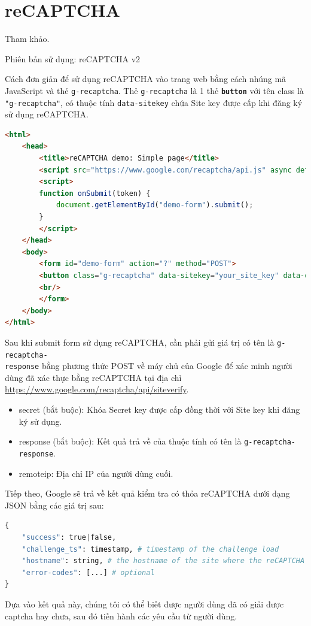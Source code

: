 \section{reCAPTCHA}
Tham khảo\cite{captcha}.
\par
Phiên bản sử dụng: reCAPTCHA v2
\par
Cách đơn giản để sử dụng reCAPTCHA vào trang web bằng cách nhúng mã JavaScript và thẻ \texttt{g-recaptcha}. Thẻ \texttt{g-recaptcha} là 1 thẻ \textbf{\texttt{button}} với tên class là \texttt{"g-recaptcha"}, có thuộc tính \texttt{data-sitekey} chứa Site key được cấp khi đăng ký sử dụng reCAPTCHA.
\begin{lstlisting}[language=HTML]
<html>
  	<head>
    	<title>reCAPTCHA demo: Simple page</title>
     	<script src="https://www.google.com/recaptcha/api.js" async defer></script>
     	<script>
       	function onSubmit(token) {
         	document.getElementById("demo-form").submit();
       	}
     	</script>
  	</head>
  	<body>
    	<form id="demo-form" action="?" method="POST">
      	<button class="g-recaptcha" data-sitekey="your_site_key" data-callback="onSubmit">Submit</button>
      	<br/>
    	</form>
  	</body>
</html>
\end{lstlisting}
\par
Sau khi submit form sử dụng reCAPTCHA, cần phải gửi giá trị có tên là \texttt{g-recaptcha-\\response} bằng phương thức POST về máy chủ của Google để xác minh người dùng đã xác thực bằng reCAPTCHA tại địa chỉ \url{https://www.google.com/recaptcha/api/siteverify}.
\begin{itemize}
	\item secret (bắt buộc): Khóa Secret key được cấp đồng thời với Site key khi đăng ký sử dụng.
	\item response (bắt buộc): Kết quả trả về của thuộc tính có tên là \texttt{g-recaptcha-response}.
	\item remoteip: Địa chỉ IP của người dùng cuối.
\end{itemize}
\par
Tiếp theo, Google sẽ trả về kết quả kiểm tra có thỏa reCAPTCHA dưới dạng JSON bằng các giá trị sau:
\begin{lstlisting}[language=Python]
{
	"success": true|false,
	"challenge_ts": timestamp, # timestamp of the challenge load
	"hostname": string, # the hostname of the site where the reCAPTCHA was solved
	"error-codes": [...] # optional
}
\end{lstlisting}
\par
Dựa vào kết quả này, chúng tôi có thể biết được người dùng đã có giải được captcha hay chưa, sau đó tiến hành các yêu cầu từ người dùng.	
